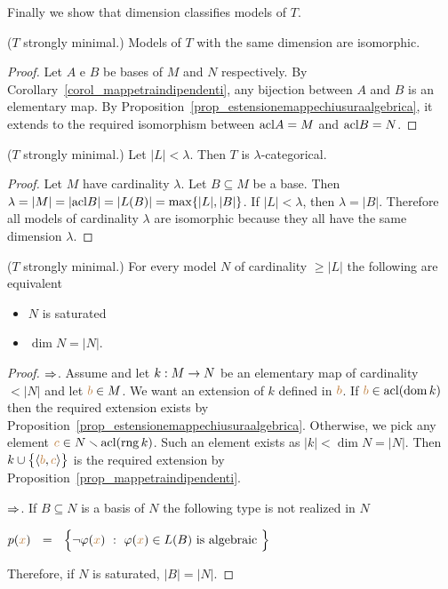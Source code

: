 Finally we show that dimension classifies models of $T$.

\begin{theorem}\label{thm_dim_classify_sm_models}
  ($T$ strongly minimal.)
  Models of $T$ with the same dimension are isomorphic.
\end{theorem}
\begin{proof}
  Let $A$ e $B$ be bases of $M$ and $N$ respectively.
  By Corollary~\ref{corol_mappetraindipendenti}, any bijection between $A$ and $B$ is an elementary map.
  By Proposition~\ref{prop_estensionemappechiusuraalgebrica}, it extends to the required isomorphism between ${\rm acl} A=M$ and ${\rm acl} B=N$.
\end{proof}

\begin{corollary} 
  ($T$ strongly minimal.) Let $|L|<\lambda$. Then $T$ is $\lambda$-categorical.
\end{corollary}
\begin{proof}
  Let $M$ have cardinality $\lambda$. 
  Let $B\subseteq M$  be a base.
  Then $\lambda=|M|=|{\rm acl} B|=|L(B)|=\max\{|L|,|B|\}$.
  If $|L|<\lambda$, then $\lambda=|B|$.
  Therefore all models of cardinality $\lambda$ are isomorphic because they all have the same dimension $\lambda$.
\end{proof}

\begin{proposition}
  ($T$ strongly minimal.) For every model $N$ of cardinality $\ge|L|$ the following are equivalent
  \begin{itemize}
  \item[1.] $N$ is saturated
  \item[2.] $\dim N=|N|$.
  \end{itemize}
\end{proposition}

\begin{proof}
  $\Rightarrow$.
  Assume  and let $k:M\rightarrow N$ be an elementary map of cardinality $<|N|$ and let ${\color{brown} b}\in M$.
  We want an extension of $k$ defined in ${\color{brown} b}$.
  If ${\color{brown} b}\in{\rm acl}(\mathop{\rm dom} k)$ then the required extension exists by Proposition~\ref{prop_estensionemappechiusuraalgebrica}.
  Otherwise, we pick any element ${\color{brown} c}\in N\smallsetminus{\rm acl}(\mathop{\rm rng} k)$.
  Such an element exists as $|k|<\dim N=|N|$.
  Then $k\cup\big\{\langle{\color{brown}b},{\color{brown} c}\rangle\big\}$ is the required extension by Proposition~\ref{prop_mappetraindipendenti}.

  $\Rightarrow$.
  If $B\subseteq N$ is a basis of $N$ the following type is not realized in $N$

  \hfil $p({\color{brown} x})\ \ =\ \ \Big\{\neg\varphi({\color{brown} x})\ :\ \varphi({\color{brown} x})\in L(B)\textrm{ is algebraic }\Big\}$

  Therefore, if $N$ is saturated, $|B|=|N|$.
\end{proof}

